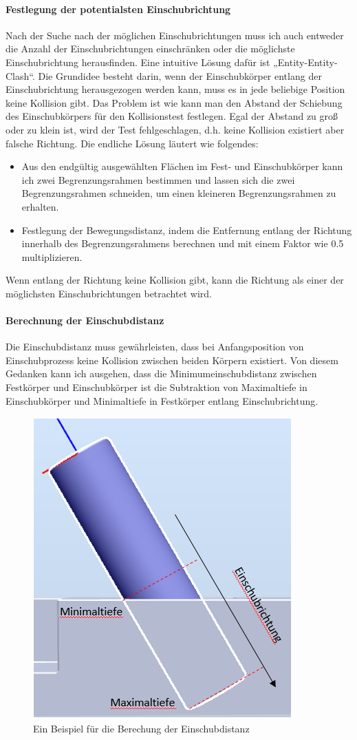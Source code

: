\documentclass[14pt,a4paper,titlepage]{article}
\begin{document}
		\paragraph{Festlegung der potentialsten Einschubrichtung}
		Nach der Suche nach der möglichen Einschubrichtungen muss ich auch entweder die Anzahl der Einschubrichtungen einschränken oder die möglichste Einschubrichtung herausfinden. Eine intuitive Lösung dafür ist „Entity-Entity-Clash“. Die Grundidee besteht darin, wenn der Einschubkörper entlang der Einschubrichtung herausgezogen werden kann, muss es in jede beliebige Position keine Kollision gibt.   
		\bigbreak
		Das Problem ist wie kann man den Abstand der Schiebung des Einschubkörpers für den Kollisionstest festlegen. Egal der Abstand zu groß oder zu klein ist, wird der Test fehlgeschlagen, d.h. keine Kollision existiert aber falsche Richtung. Die endliche Lösung läutert wie folgendes:
		\begin{itemize}
			\item Aus den endgültig ausgewählten Flächen im Fest- und Einschubkörper kann ich zwei Begrenzungsrahmen bestimmen und lassen sich die zwei Begrenzungsrahmen schneiden, um einen kleineren Begrenzungsrahmen zu erhalten.
			
			\item Festlegung der Bewegungsdistanz, indem die Entfernung entlang der Richtung innerhalb des Begrenzungsrahmens berechnen und mit einem Faktor wie 0.5 multiplizieren.
		\end{itemize}                                  
		Wenn entlang der Richtung keine Kollision gibt, kann die Richtung als einer der möglichsten Einschubrichtungen betrachtet wird. 
		
		\paragraph{Berechnung der Einschubdistanz}
		 Die Einschubdistanz muss gewährleisten, dass bei Anfangsposition von Einschubprozess keine Kollision zwischen beiden Körpern existiert. 
		 Von diesem Gedanken kann ich ausgehen, dass die Minimumeinschubdistanz zwischen Festkörper und Einschubkörper ist die Subtraktion von Maximaltiefe in Einschubkörper und Minimaltiefe in Festkörper entlang Einschubrichtung.\\
		 	\begin{figure}[h!]
		 	\centering
		 	\includegraphics[width=0.3\linewidth]{Einschubdistanz.png}
		 	\caption{Ein Beispiel für die Berechung der Einschubdistanz}
		 	\end{figure} 
	 	
\end{document}
